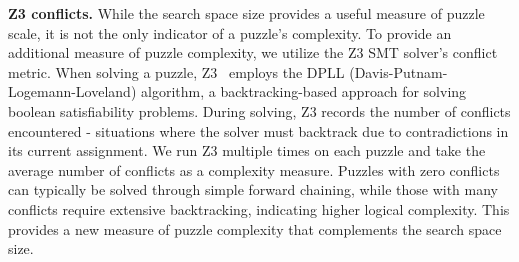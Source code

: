 \textbf{Z3 conflicts.}
While the search space size provides a useful measure of puzzle scale, it is not the only indicator of a puzzle's complexity.
To provide an additional measure of puzzle complexity, we utilize the Z3 SMT solver's conflict metric. When solving a puzzle, Z3~\citep{Z3} employs the DPLL (Davis-Putnam-Logemann-Loveland) algorithm, a backtracking-based approach for solving boolean satisfiability problems. During solving, Z3 records the number of conflicts encountered - situations where the solver must backtrack due to contradictions in its current assignment. We run Z3 multiple times on each puzzle and take the average number of conflicts as a complexity measure. Puzzles with zero conflicts can typically be solved through simple forward chaining, while those with many conflicts require extensive backtracking, indicating higher logical complexity. This provides a new measure of puzzle complexity that complements the search space size.










    
    
    
    
    
    
    
    
    
